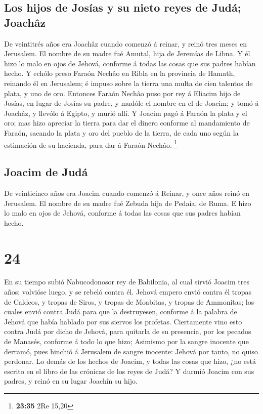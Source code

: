 \hypertarget{los-hijos-de-josuxedas-y-su-nieto-reyes-de-juduxe1-joachuxe2z}{%
\subsection{Los hijos de Josías y su nieto reyes de Judá;
Joachâz}\label{los-hijos-de-josuxedas-y-su-nieto-reyes-de-juduxe1-joachuxe2z}}

 De veintitrés años era Joachâz cuando comenzó á reinar,
y reinó tres meses en Jerusalem. El nombre de su madre fué Amutal, hija
de Jeremías de Libna.  Y él hizo lo malo en ojos de
Jehová, conforme á todas las cosas que sus padres habían hecho.
 Y echólo preso Faraón Nechâo en Ribla en la provincia de
Hamath, reinando él en Jerusalem; é impuso sobre la tierra una multa de
cien talentos de plata, y uno de oro.  Entonces Faraón
Nechâo puso por rey á Eliacim hijo de Josías, en lugar de Josías su
padre, y mudóle el nombre en el de Joacim; y tomó á Joachâz, y llevólo á
Egipto, y murió allí.  Y Joacim pagó á Faraón la plata y
el oro; mas hizo apreciar la tierra para dar el dinero conforme al
mandamiento de Faraón, sacando la plata y oro del pueblo de la tierra,
de cada uno según la estimación de su hacienda, para dar á Faraón
Nechâo. \footnote{\textbf{23:35} 2Re 15,20}

\hypertarget{joacim-de-juduxe1}{%
\subsection{Joacim de Judá}\label{joacim-de-juduxe1}}

 De veinticinco años era Joacim cuando comenzó á Reinar,
y once años reinó en Jerusalem. El nombre de su madre fué Zebuda hija de
Pedaia, de Ruma.  E hizo lo malo en ojos de Jehová,
conforme á todas las cosas que sus padres habían hecho.

\hypertarget{section-23}{%
\section{24}\label{section-23}}

 En su tiempo subió Nabucodonosor rey de Babilonia, al
cual sirvió Joacim tres años; volvióse luego, y se rebeló contra él.
 Jehová empero envió contra él tropas de Caldeos, y tropas
de Siros, y tropas de Moabitas, y tropas de Ammonitas; los cuales envió
contra Judá para que la destruyesen, conforme á la palabra de Jehová que
había hablado por sus siervos los profetas.  Ciertamente
vino esto contra Judá por dicho de Jehová, para quitarla de su
presencia, por los pecados de Manasés, conforme á todo lo que hizo;
 Asimismo por la sangre inocente que derramó, pues hinchió
á Jerusalem de sangre inocente: Jehová por tanto, no quiso perdonar.
 Lo demás de los hechos de Joacim, y todas las cosas que
hizo, ¿no está escrito en el libro de las crónicas de los reyes de Judá?
 Y durmió Joacim con sus padres, y reinó en su lugar
Joachîn su hijo.

